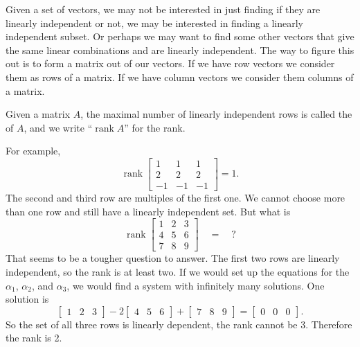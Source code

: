 \documentclass{ximera}
\begin{document}
Given a set of vectors, we may not be interested in just finding if they are linearly independent or not, we may be interested in finding a linearly independent subset.  Or perhaps we may want to find some other vectors that give the same linear combinations and are linearly independent. The way to figure this out is to form a matrix out of our vectors.  If we have row vectors we consider them as rows of a matrix.  If we have column vectors we consider them columns of a matrix.


\begin{definition}
    Given a matrix $A$, the maximal number of linearly independent rows is called the \emph{} of $A$, and we write ``$\operatorname{rank} A$'' for the rank.
\end{definition}
For example,
\begin{equation*}
    \operatorname{rank}
    \begin{bmatrix}
        1 & 1 & 1 \\
        2 & 2 & 2 \\
        -1 & -1 & -1
    \end{bmatrix}
    = 1 .
\end{equation*}
The second and third row are multiples of the first one.  We cannot choose more than one row and still have a linearly independent set.   But what is
\begin{equation*}
    \operatorname{rank}
    \begin{bmatrix}
        1 & 2 & 3 \\
        4 & 5 & 6 \\
        7 & 8 & 9
    \end{bmatrix} \quad = \quad ?
\end{equation*}
That seems to be a tougher question to answer.  The first two rows are linearly independent, so the rank is at least two.  If we would set up the equations for the $\alpha_1$, $\alpha_2$, and $\alpha_3$, we would find a system with infinitely many solutions.  One solution is
\begin{equation*}
    \begin{bmatrix}
        1 & 2 & 3
    \end{bmatrix} -2
    \begin{bmatrix}
        4 & 5 & 6 
    \end{bmatrix} +
    \begin{bmatrix}
        7 & 8 & 9
    \end{bmatrix} =
    \begin{bmatrix}
        0 & 0 & 0
    \end{bmatrix} .
\end{equation*}
So the set of all three rows is linearly dependent, the rank cannot be 3.  Therefore the rank is 2.
\end{document}
